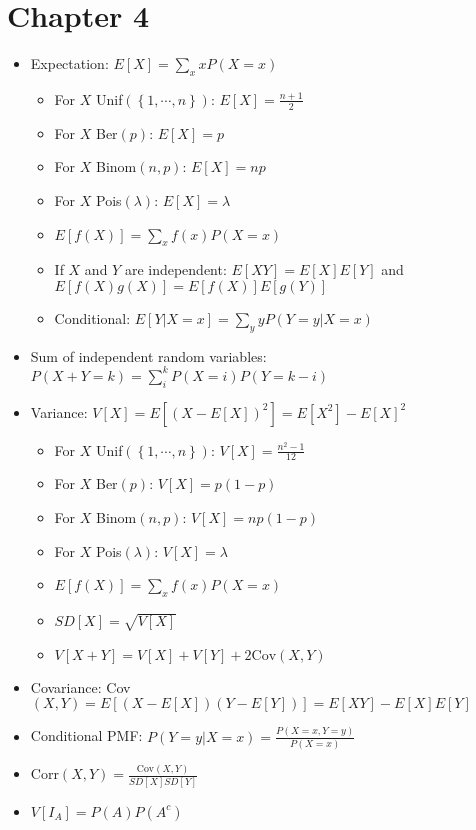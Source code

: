 \documentclass{article}
\begin{document}
\section*{Chapter 4}
\begin{itemize}
	\item Expectation: $E[X] = \sum_x xP(X=x)$
	\begin{itemize}
		\item For $X$ Unif$\left(\left\{1, \cdots, n\right\}\right)$: $E[X] = \frac{n+1}{2}$
		\item For $X$ Ber$(p)$: $E[X] = p$
		\item For $X$ Binom$(n,p)$: $E[X] = np$
		\item For $X$ Pois$(\lambda)$: $E[X] = \lambda$
		\item $E[f(X)] = \sum_x f(x)P(X=x)$
		\item If $X$ and $Y$ are independent: $E[XY] = E[X]E[Y]$ and $E[f(X)g(X)] = E[f(X)]E[g(Y)]$
		\item Conditional: $E[Y|X=x] = \sum_y yP(Y=y|X=x)$
	\end{itemize} 
	\item Sum of independent random variables: $P(X+Y=k) = \sum_i^k P(X=i)P(Y = k-i)$
	\item Variance: $V[X] = E\left[(X-E[X])^2\right] = E[X^2] - E[X]^2$
	\begin{itemize}
		\item For $X$ Unif$\left(\left\{1, \cdots, n\right\}\right)$: $V[X] = \frac{n^2-1}{12}$
		\item For $X$ Ber$(p)$: $V[X] = p(1-p)$
		\item For $X$ Binom$(n,p)$: $V[X] = np(1-p)$
		\item For $X$ Pois$(\lambda)$: $V[X] = \lambda$
		\item $E[f(X)] = \sum_x f(x)P(X=x)$
		\item $SD[X] = \sqrt{V[X]}$
		\item $V[X+Y] = V[X] + V[Y] + 2\text{Cov}(X,Y)$
	\end{itemize}
	\item Covariance: Cov$\left(X,Y\right) = E[(X-E[X])(Y-E[Y])] = E[XY] - E[X]E[Y]$
	\item Conditional PMF: $P(Y=y|X=x) = \frac{P(X=x,Y=y)}{P(X=x)}$
	\item Corr$(X,Y) = \frac{\text{Cov}(X,Y)}{SD[X]SD[Y]}$
	\item $V[I_A] = P(A)P(A^c)$
\end{itemize}
\noindent\makebox[\linewidth]{\rule{\paperwidth}{0.4pt}}
	
\end{document}
